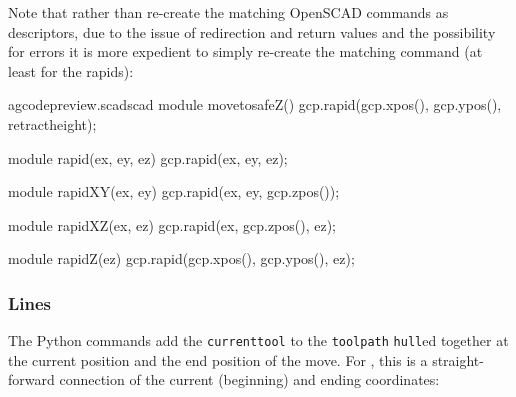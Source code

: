 \documentclass{ltxdoc}
\begin{document}
Note that rather than re-create the matching OpenSCAD commands as descriptors, due to the issue of redirection and return values and the possibility for errors it is more expedient to simply re-create the matching command (at least for the rapids):

\lstset{firstnumber=\thegcpscad}
\begin{writecode}{a}{gcodepreview.scad}{scad}
module movetosafeZ(){
    gcp.rapid(gcp.xpos(), gcp.ypos(), retractheight);
}

module rapid(ex, ey, ez) {
    gcp.rapid(ex, ey, ez);
}

module rapidXY(ex, ey) {
    gcp.rapid(ex, ey, gcp.zpos());
}

module rapidXZ(ex, ez) {
    gcp.rapid(ex, gcp.zpos(), ez);
}

module rapidZ(ez) {
    gcp.rapid(gcp.xpos(), gcp.ypos(), ez);
}

\end{writecode}
\addtocounter{gcpscad}{20}

\subsubsection{Lines}

The Python commands  add the \verb|currenttool| to the \verb|toolpath| \verb|hull|ed together at the current position and the end position of the move. For , this is a straight-forward connection of the current (beginning) and ending coordinates:
\end{document}
